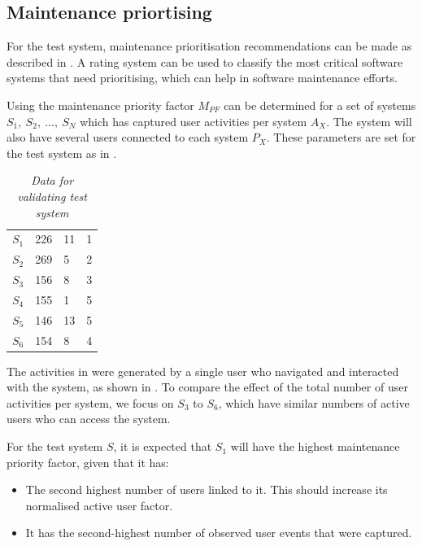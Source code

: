 \subsection{Maintenance priortising}
For the test system, maintenance prioritisation recommendations can be made as described in . A rating system can be used to classify the most critical software systems that need prioritising, which can help in software maintenance efforts.\par Using  the maintenance priority factor $M_{PF}$ can be determined for a set of systems {$S_1,~S_2,~...,~S_N$} which has captured user activities per system $A_X$. The system will also have several users connected to each system $P_X$. These parameters are set for the test system as in .

\begin{table}[!htb]
	\centering
	\caption[Data for validating test system]
	{\textit{Data for validating test system}}
	\label{tbl:ch3_testData}
	\begin{tabularx}{\textwidth}{XXXX}
		\toprule
		\thead{System ($S_X$)} & \thead{Users per system ($P_X$)} & \thead{Number of events ($A_X$)} & \thead{Expected priority} \\
		\midrule
		\rowcolor{lightgray}
		$S_1$ & 226 & 11 & 1 \\
		$S_2$ & 269 & 5 & 2 \\
		\rowcolor{lightgray}
		$S_3$ & 156 & 8 & 3 \\
		$S_4$ & 155 & 1 & 5 \\
		\rowcolor{lightgray}
		$S_5$ & 146 & 13 & 5 \\
		$S_6$ & 154 & 8 & 4 \\
		\bottomrule
	\end{tabularx}
\end{table}

The activities in  were generated by a single user who navigated and interacted with the system, as shown in . To compare the effect of the total number of user activities per system, we focus on $S_3$ to $S_6$, which have similar numbers of active users who can access the system.\par For the test system $S$, it is expected that $S_1$ will have the highest maintenance priority factor, given that it has:

\begin{itemize}
	\item The second highest number of users linked to it. This should increase its normalised active user factor.
	\item It has the second-highest number of observed user events that were captured.
\end{itemize}

